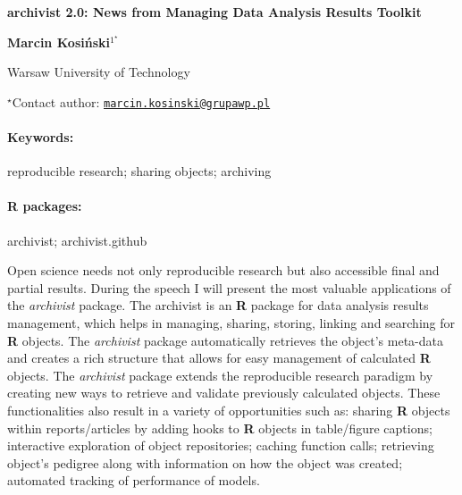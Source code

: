 \documentclass[11pt, a4paper]{article}
\renewcommand{\title}[1]{\begin{center}{\bf \LARGE #1}\end{center}}
\newcommand{\keywords}{\paragraph{Keywords:}}
\newcommand{\packages}{\paragraph{R packages:}}
\begin{document}
\pagestyle{empty}

\title{archivist 2.0: News from Managing Data Analysis Results Toolkit}

\begin{center}
  {\bf Marcin Kosiński$^{1^\star}$}
\end{center}

\vskip 0.3cm

\begin{affiliations}
\begin{enumerate}
\begin{minipage}{0.915\textwidth}
\centering
\item Warsaw University of Technology \\[-2pt]
\end{minipage}
\end{enumerate}
$^\star$Contact author: \href{mailto:marcin.kosinski@grupawp.pl}{\nolinkurl{marcin.kosinski@grupawp.pl}}\\
\end{affiliations}

\vskip 0.5cm

\begin{minipage}{0.915\textwidth}
\keywords reproducible research; sharing objects; archiving
\packages archivist; archivist.github
\end{minipage}

\vskip 0.8cm

Open science needs not only reproducible research but also accessible
final and partial results. During the speech I will present the most
valuable applications of the \emph{archivist} package. The archivist is
an \textbf{R} package for data analysis results management, which helps
in managing, sharing, storing, linking and searching for \textbf{R}
objects. The \emph{archivist} package automatically retrieves the
object's meta-data and creates a rich structure that allows for easy
management of calculated \textbf{R} objects. The \emph{archivist}
package extends the reproducible research paradigm by creating new ways
to retrieve and validate previously calculated objects. These
functionalities also result in a variety of opportunities such as:
sharing \textbf{R} objects within reports/articles by adding hooks to
\textbf{R} objects in table/figure captions; interactive exploration of
object repositories; caching function calls; retrieving object's
pedigree along with information on how the object was created; automated
tracking of performance of models.
\end{document}

